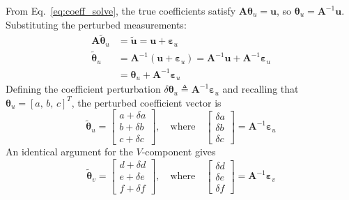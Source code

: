\documentclass[lettersize,journal]{IEEEtran}
\begin{document}
From Eq.~\eqref{eq:coeff_solve}, the true coefficients satisfy $\mathbf{A}\boldsymbol{\theta}_u = \mathbf{u}$, so $\boldsymbol{\theta}_u = \mathbf{A}^{-1}\mathbf{u}$. Substituting the perturbed measurements:
\begin{align}
    \mathbf{A}\tilde{\boldsymbol{\theta}}_u &= \tilde{\mathbf{u}} = \mathbf{u} + \boldsymbol{\varepsilon}_u \nonumber \\
    \tilde{\boldsymbol{\theta}}_u &= \mathbf{A}^{-1}(\mathbf{u} + \boldsymbol{\varepsilon}_u) = \mathbf{A}^{-1}\mathbf{u} + \mathbf{A}^{-1}\boldsymbol{\varepsilon}_u \nonumber \\
    &= \boldsymbol{\theta}_u + \mathbf{A}^{-1}\boldsymbol{\varepsilon}_u
    \label{eq:perturbed_theta_u}
\end{align}
Defining the coefficient perturbation $\delta\boldsymbol{\theta}_u \triangleq \mathbf{A}^{-1}\boldsymbol{\varepsilon}_u$ and recalling that $\boldsymbol{\theta}_u = [a,\, b,\, c]^T$, the perturbed coefficient vector is
\begin{equation}
    \tilde{\boldsymbol{\theta}}_u = \begin{bmatrix} a + \delta a \\ b + \delta b \\ c + \delta c \end{bmatrix}, \quad \text{where} \quad
    \begin{bmatrix} \delta a \\ \delta b \\ \delta c \end{bmatrix} = \mathbf{A}^{-1}\boldsymbol{\varepsilon}_u
    \label{eq:delta_theta_u}
\end{equation}
An identical argument for the $V$-component gives
\begin{equation}
    \tilde{\boldsymbol{\theta}}_v = \begin{bmatrix} d + \delta d \\ e + \delta e \\ f + \delta f \end{bmatrix}, \quad \text{where} \quad
    \begin{bmatrix} \delta d \\ \delta e \\ \delta f \end{bmatrix} = \mathbf{A}^{-1}\boldsymbol{\varepsilon}_v
    \label{eq:delta_theta_v}
\end{equation}
\end{document}
